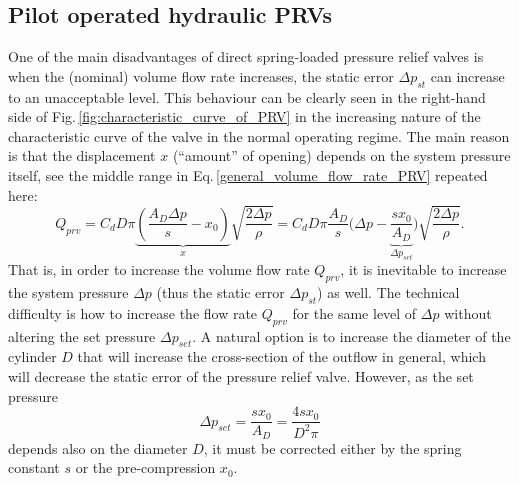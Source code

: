 \subsection{Pilot operated hydraulic PRVs} \label{sec:pilot_operated_PRV}
One of the main disadvantages of direct spring-loaded pressure relief valves is when the (nominal) volume flow rate increases, the static error $\Delta p_{st}$ can increase to an unacceptable level. This behaviour can be clearly seen in the right-hand side of Fig.\,\ref{fig:characteristic_curve_of_PRV} in the increasing nature of the characteristic curve of the valve in the normal operating regime. The main reason is that the displacement $x$ (``amount'' of opening) depends on the system pressure itself, see the middle range in Eq.\,\eqref{general_volume_flow_rate_PRV} repeated here:
%
\begin{equation}
Q_{prv} = C_d D \pi  \underbrace{ \left( \dfrac{A_D \Delta p}{s} - x_0 \right) }_{x} \sqrt{ \dfrac{2 \Delta p}{\rho} } = 
 C_d D \pi \frac{A_D}{s} \bigg( \Delta p - \underbrace{\frac{s x_0}{A_D}}_{\Delta p_{set}} \bigg) \sqrt{ \dfrac{2 \Delta p}{\rho} }.
\end{equation}
%
That is, in order to increase the volume flow rate $Q_{prv}$, it is inevitable to increase the system pressure $\Delta p$ (thus the static error $\Delta p_{st}$) as well. The technical difficulty is how to increase the flow rate $Q_{prv}$ for the same level of $\Delta p$ without altering the set pressure $\Delta p_{set}$. A natural option is to increase the diameter of the cylinder $D$ that will increase the cross-section of the outflow in general, which will decrease the static error of the pressure relief valve. However, as the set pressure
%
\begin{equation} \label{set_presusre_adjustment}
\Delta p_{set} = \frac{s x_0}{A_D} = \frac{4 s x_0}{D^2 \pi}
\end{equation}
%
depends also on the diameter $D$, it must be corrected either by the spring constant $s$ or the pre-compression $x_0$.

